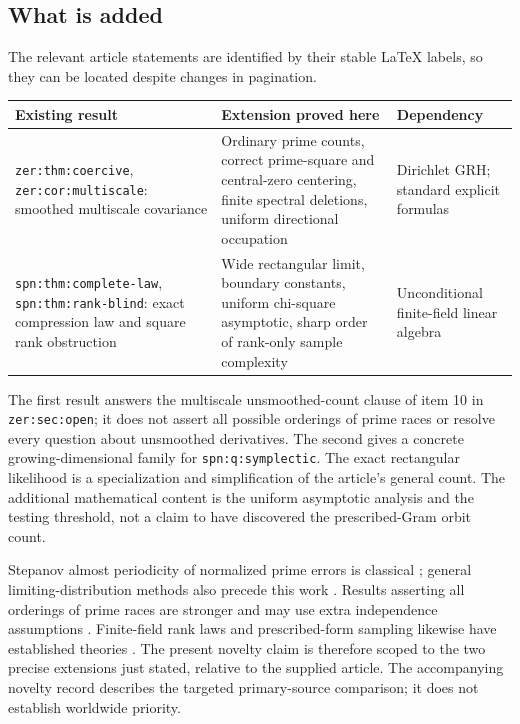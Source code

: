 \documentclass[11pt,letterpaper]{article}
\numberwithin{equation}{section}
\theoremstyle{definition}
\theoremstyle{remark}
\begin{document}
\subsection{What is added}
The relevant article statements are identified by their stable LaTeX labels,
so they can be located despite changes in pagination.
\begin{center}\small
\begin{tabular}{>{\raggedright\arraybackslash}p{}>{\raggedright\arraybackslash}p{}>{\raggedright\arraybackslash}p{}}
\toprule
Existing result & Extension proved here & Dependency\\
\midrule
\texttt{zer:thm:coercive}, \texttt{zer:cor:multiscale}: smoothed multiscale covariance
& Ordinary prime counts, correct prime-square and central-zero centering,
finite spectral deletions, uniform directional occupation
& Dirichlet GRH; standard explicit formulas\\[5pt]
\texttt{spn:thm:complete-law}, \texttt{spn:thm:rank-blind}: exact compression law and square rank obstruction
& Wide rectangular limit, boundary constants, uniform chi-square asymptotic,
sharp order of rank-only sample complexity
& Unconditional finite-field linear algebra\\
\bottomrule
\end{tabular}
\end{center}

The first result answers the multiscale unsmoothed-count clause of item 10
in \texttt{zer:sec:open}; it does not assert all possible orderings of prime
races or resolve every question about unsmoothed derivatives.
The second gives a concrete growing-dimensional family for
\texttt{spn:q:symplectic}. The exact rectangular likelihood is a specialization
and simplification of the article's general count. The additional mathematical
content is the uniform asymptotic analysis and the testing threshold, not a
claim to have discovered the prescribed-Gram orbit count.

Stepanov almost periodicity of normalized prime errors is classical
\cite{KaczorowskiRamare2003}; general limiting-distribution methods also precede
this work \cite{AkbaryNgShahabi2014}. Results asserting all orderings of prime
races are stronger and may use extra independence assumptions
\cite{MartinNg2019}. Finite-field rank laws and prescribed-form sampling likewise
have established theories \cite{FulmanGoldstein2015,Ishizuka2026}. The present
novelty claim is therefore scoped to the two precise extensions just stated,
relative to the supplied article. The accompanying novelty record describes
the targeted primary-source comparison; it does not establish worldwide priority.
\end{document}
